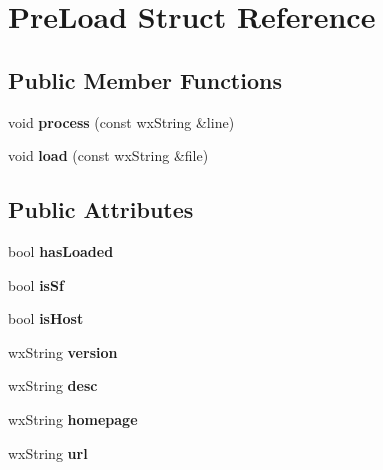 \hypertarget{struct_pre_load}{\section{Pre\-Load Struct Reference}
\label{struct_pre_load}
}
\subsection*{Public Member Functions}
\begin{DoxyCompactItemize}
\item 
\hypertarget{struct_pre_load_a2ce8fa8a12cc11bca593ce8ab3baca4c}{void {\bfseries process} (const wx\-String \&line)}\label{struct_pre_load_a2ce8fa8a12cc11bca593ce8ab3baca4c}

\item 
\hypertarget{struct_pre_load_a6c381d8bba74741b1d72598027159ea1}{void {\bfseries load} (const wx\-String \&file)}\label{struct_pre_load_a6c381d8bba74741b1d72598027159ea1}

\end{DoxyCompactItemize}
\subsection*{Public Attributes}
\begin{DoxyCompactItemize}
\item 
\hypertarget{struct_pre_load_a3887a213a5f86c90bed182a532d0c215}{bool {\bfseries has\-Loaded}}\label{struct_pre_load_a3887a213a5f86c90bed182a532d0c215}

\item 
\hypertarget{struct_pre_load_ab30eb6705a5a66bf991799d53a17bbee}{bool {\bfseries is\-Sf}}\label{struct_pre_load_ab30eb6705a5a66bf991799d53a17bbee}

\item 
\hypertarget{struct_pre_load_a948b30de075df3f7ddd26ce4af7dd2e7}{bool {\bfseries is\-Host}}\label{struct_pre_load_a948b30de075df3f7ddd26ce4af7dd2e7}

\item 
\hypertarget{struct_pre_load_aea3e11eade8bc0e5618ae555e5246d54}{wx\-String {\bfseries version}}\label{struct_pre_load_aea3e11eade8bc0e5618ae555e5246d54}

\item 
\hypertarget{struct_pre_load_a3f2c49a50c9ebdec81879cea585f7e33}{wx\-String {\bfseries desc}}\label{struct_pre_load_a3f2c49a50c9ebdec81879cea585f7e33}

\item 
\hypertarget{struct_pre_load_a572b282861cd3f8339817aa2ac96da7c}{wx\-String {\bfseries homepage}}\label{struct_pre_load_a572b282861cd3f8339817aa2ac96da7c}

\item 
\hypertarget{struct_pre_load_a13ebb093dd9aa677658d19e50bdcb3e8}{wx\-String {\bfseries url}}\label{struct_pre_load_a13ebb093dd9aa677658d19e50bdcb3e8}

\end{DoxyCompactItemize}


